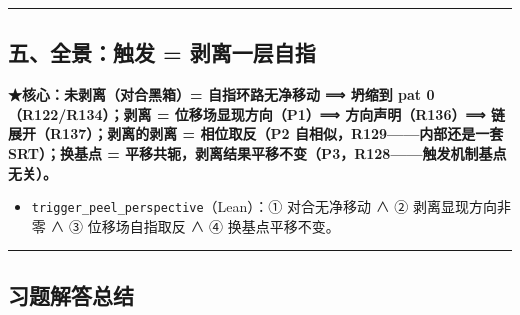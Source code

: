 \documentclass[
]{article}
\providecommand{\tightlist}{%
  \setlength{\itemsep}{0pt}\setlength{\parskip}{0pt}}
\begin{document}
\begin{center}\rule{0.5\linewidth}{0.5pt}\end{center}

\subsection{五、全景：触发 =
剥离一层自指}\label{ux4e94ux5168ux666fux89e6ux53d1-ux5265ux79bbux4e00ux5c42ux81eaux6307}

\textbf{★核心：未剥离（对合黑箱）= 自指环路无净移动 ⟹ 坍缩到 pat
0（R122/R134）；剥离 = 位移场显现方向（P1）⟹ 方向声明（R136）⟹
链展开（R137）；剥离的剥离 = 相位取反（P2 自相似，R129------内部还是一套
SRT）；换基点 =
平移共轭，剥离结果平移不变（P3，R128------触发机制基点无关）。}

\begin{itemize}
\tightlist
\item
  \texttt{trigger\_peel\_perspective}（Lean）：① 对合无净移动 ∧ ②
  剥离显现方向非零 ∧ ③ 位移场自指取反 ∧ ④ 换基点平移不变。
\end{itemize}

\begin{center}\rule{0.5\linewidth}{0.5pt}\end{center}

\subsection{习题解答总结}\label{ux4e60ux9898ux89e3ux7b54ux603bux7ed3}
\end{document}
